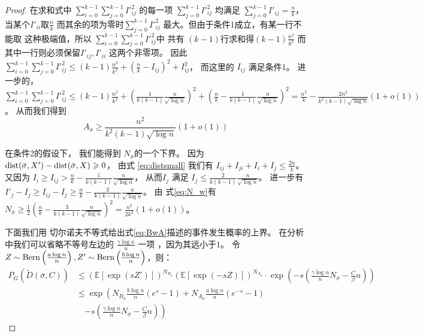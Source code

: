\begin{proof}
    在求和式中 $\sum_{i=0}^{k-1} \sum_{j=0}^{k-1} I'^2_{ij}$
    的每一项 $\sum_{j=0}^{k-1} I'^2_{ij}$
    均满足 $\sum_{j=0}^{k-1}
    I'_{ij} = \frac{n}{k}$，当某个$I'_{ii}$取$\frac{n}{k}$
    而其余的项为零时$\sum_{j=0}^{k-1} I'^2_{ij}$
    最大。但由于条件1成立，有某一行不能取
    这种极端值，所以 $\sum_{i=0}^{k-1} \sum_{j=0}^{k-1} I'^2_{ij}$中
    共有 $(k-1)$行求和得$ (k-1)\frac{n^2}{k^2}$
    而其中一行则必须保留$I'_{ij}, I'_{ii}$ 这两个非零项。
    因此
    $\sum_{i=0}^{k-1} \sum_{j=0}^{k-1} I'^2_{ij}
    \leq (k-1)\frac{n^2}{k^2} + (\frac{n}{k} - I_{ij})^2 + I^2_{ij}$，
    而这里的
    $I_{ij}$ 满足条件1。
    进一步的， $\sum_{i=0}^{k-1} \sum_{j=0}^{k-1} I'^2_{ij} \leq (k-1)\frac{n^2}{k^2} + 
    \left(\frac{1}{k(k-1)}\frac{n}{\sqrt{\log n}} \right)^2
    + \left(\frac{n}{k} - \frac{1}{k(k-1)}\frac{n}{\sqrt{\log n}} \right)^2 
    = \frac{n^2}{k} - \frac{2n^2}{k^2 (k-1)\sqrt{\log n}}(1+o(1))$。
    从而我们得到
  \begin{equation}\label{eq:Asigma}
    A_{\bar{\sigma}} \geq \frac{n^2}{k^2 (k-1)\sqrt{\log n}}(1+o(1))
    \end{equation}
    
    
    在条件2的假设下， 我们能得到
    $N_{\bar{\sigma}}$的一个下界。
    因为
    $\operatorname{dist}(\bar{\sigma}, X') - \operatorname{dist}(\bar{\sigma}, X) \geqslant 0$，
     由式 \eqref{eq:distsmall}  我们有
    $I_{ij} + I_{ji} + I_{i} + I_j \leq \frac{2n}{k} $。
    又因为 $I_i \geq I_{ij} > \frac{n}{k} - \frac{1}{k(k-1)}\frac{n}{\sqrt{\log n}}$，
    从而$I_j $ 满足
    $I_j \leq \frac{2}{k(k-1)}\frac{n}{\sqrt{\log n} }$。
    进一步有 $I'_j - I_j \geq I_{ij} - I_j \geq  \frac{n}{k} - \frac{3}{k(k-1)}\frac{n}{\sqrt{\log n} }$。
    由 式\eqref{eq:N_w}有
     $N_{\bar{\sigma}} \geq \frac{1}{2}
     \left(\frac{n}{k} - \frac{3}{k(k-1)}\frac{n}{\sqrt{\log n}} \right)^2 
     = \frac{n^2}{2k^2}(1+o(1))$。
    
    下面我们用
     切尔诺夫不等式给出式\eqref{eq:BwA}描述的事件发生概率的上界。
     在分析中我们可以省略不等号左边的 $\frac{\gamma \log n}{n}$ 一项
     ，因为其远小于$1$。
    令 $Z \sim \operatorname{Bern}\left(\frac{a \log n}{n}\right), Z' \sim \operatorname{Bern}\left(\frac{b \log n}{n}\right)$，则：
    \begin{align*}
    P_G(\widetilde{D}(\bar{\sigma}, C))
    &\leq (\mathbb{E}[\exp(sZ')])^{N_{B_{\bar{\sigma}}}}
    (\mathbb{E}[\exp(-sZ)])^{N_{A_{\bar{\sigma}}}}\cdot 
    \exp\left(
      -s\left(
        \frac{\gamma \log n}{n} N_{\bar{\sigma}}  - \frac{C}{\beta}n
      \right)
      \right) \\
    & \leq \exp\left(N_{B_{\bar{\sigma}}}
    \frac{b\log n}{n}(e^s -1) + 
    N_{A_{\bar{\sigma}}}\frac{a\log n}{n} \left(e^{-s} - 1 \right)\right. \\
    &\quad \left. - s \left(\frac{\gamma \log n}{n} N_{\bar{\sigma}} 
    - \frac{C}{\beta}n \right)
    \right) 
    \end{align*}
    

\end{proof}

